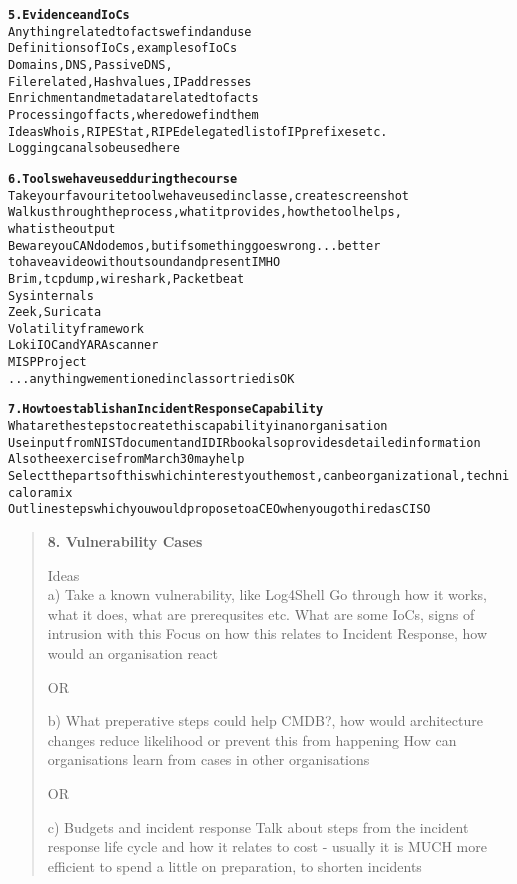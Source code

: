 \documentclass[Screen16to9,17pt]{foils}
\begin{document}


\begin{alltt}
{\bf 5. Evidence and IoCs}\\

Anything related to facts we find and use
Definitions of IoCs, examples of IoCs
Domains, DNS, Passive DNS,
File related, Hash values, IP addresses
Enrichment and metadata related to facts
Processing of facts, where do we find them
Ideas Whois, RIPE Stat, RIPE delegated list of IP prefixes etc.
Logging can also be used here


{\bf 6. Tools we have used during the course}\\
Take your favourite tool we have used in classe, create screenshot
Walk us through the process, what it provides, how the tool helps,
what is the output
Beware you CAN do demos, but if something goes wrong ... better
to have a video without sound and present IMHO
Brim, tcpdump, wireshark, Packetbeat
Sysinternals
Zeek, Suricata
Volatility framework
Loki IOC and YARA scanner
MISP Project
... anything we mentioned in class or tried is OK
\end{alltt}



\begin{alltt}
{\bf 7. How to establish an Incident Response Capability}\\
What are the steps to create this capability in an organisation
Use input from NIST document and IDIR book also provides detailed information
Also the exercise from March 30 may help
Select the parts of this which interest you the most, can be organizational, technical or a mix
Outline steps which you would propose to a CEO when you got hired as CISO
\end{alltt}



\begin{quote}
{\bf 8. Vulnerability Cases}

Ideas\\
a) Take a known vulnerability, like Log4Shell
Go through how it works, what it does, what are prerequsites etc.
What are some IoCs, signs of intrusion with this
Focus on how this relates to Incident Response, how would an organisation react

OR

b) What preperative steps could help CMDB?, how would architecture changes reduce likelihood or prevent this from happening
How can organisations learn from cases in other organisations

OR

c) Budgets and incident response
Talk about steps from the incident response life cycle and how it relates to cost
- usually it is MUCH more efficient to spend a little on preparation, to shorten incidents
\end{quote}
\end{document}
